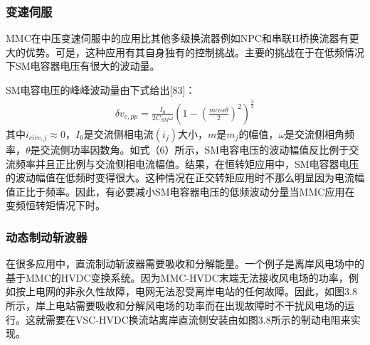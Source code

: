   \subsubsection{变速伺服}
  
  MMC在中压变速伺服中的应用比其他多级换流器例如NPC和串联H桥换流器有更大的优势。可是，这种应用有其自身独有的控制挑战。主要的挑战在于在低频情况下SM电容器电压有很大的波动量。
  
  SM电容电压的峰峰波动量由下式给出[83]：
\begin{align*}
\delta v_{c, pp} = \frac{I_0}{2C_{SM}\omega}(1-(\frac{mcos\theta}{2})^2)^{\frac{3}{2}}\tag{16}
\end{align*}
其中$i_{circ, j}\approx 0$，$I_0$是交流侧相电流$(i_j)$大小，$m$是$m_j$的幅值，$\omega$是交流侧相角频率，$\theta$是交流侧功率因数角。如式（6）所示，SM电容电压的波动幅值反比例于交流频率并且正比例与交流侧相电流幅值。结果，在恒转矩应用中，SM电容器电压的波动幅值在低频时变得很大。这种情况在正交转矩应用时不那么明显因为电流幅值正比于频率。因此，有必要减小SM电容器电压的低频波动分量当MMC应用在变频恒转矩情况下时。

  \subsubsection{动态制动斩波器}
  
  在很多应用中，直流制动斩波器需要吸收和分解能量。一个例子是离岸风电场中的基于MMC的HVDC变换系统。因为MMC-HVDC末端无法接收风电场的功率，例如按上电网的非永久性故障，电网无法忍受离岸电站的任何故障。因此，如图3.8所示，岸上电站需要吸收和分解风电场的功率而在出现故障时不干扰风电场的运行。这就需要在VSC-HVDC换流站离岸直流侧安装由如图3.8所示的制动电阻来实现。
  
